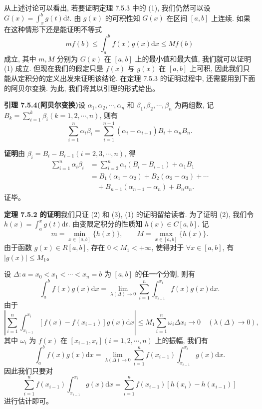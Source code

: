 \documentclass[UTF8, 12pt, fontset=fandol, oneside]{ctexart}
\begin{document}
从上述讨论可以看出, 若要证明定理 7.5.3 中的 (1), 我们仍然可以设 $G(x)=\int_x^b g(t)\mathrm dt$. 由 $g(x)$ 的可积性知 $G(x)$ 在区间 $[a,b]$ 上连续. 如果在这种情形下还是能证明不等式
\[
  mf(b)\leq\int_a^b f(x)g(x)\mathrm dx\leq Mf(b)
\]
成立, 其中 $m,M$ 分别为 $G(x)$ 在 $[a,b]$ 上的最小值和最大值, 我们就可以证明 (1) 成立. 但现在我们的假定只是 $f(x)$ 与 $g(x)$ 在 $[a,b]$ 上可积, 因此我们只能从定积分的定义出发来证明该结论. 在定理 7.5.3 的证明过程中, 还需要用到下面的阿贝尔变换. 为此, 我们将其以引理的形式给出。

\noindent\textbf{引理 7.5.4(阿贝尔变换)}\quad 设 $\alpha_1,\alpha_2,\cdots,\alpha_n$ 和 $\beta_1,\beta_2,\cdots,\beta_n$ 为两组数, 记 $B_k=\sum_{i=1}^k\beta_i(k=1,2,\cdots,n)$, 则有
\[
  \sum_{i=1}^n\alpha_i\beta_i
  =\sum_{i=1}^{n-1}(\alpha_i-\alpha_{i+1})B_i+\alpha_nB_n.
\]

\noindent\textbf{证明}\quad 由 $\beta_i=B_i-B_{i-1}(i=2,3,\cdots,n)$, 得
\[
\begin{aligned}
  \sum_{i=1}^n\alpha_i\beta_i
  &=\sum_{i=2}^n\alpha_i(B_i-B_{i-1})+\alpha_1B_1\\
  &=B_1(\alpha_1-\alpha_2)+B_2(\alpha_2-\alpha_3)+\cdots\\
  &\quad+B_{n-1}(\alpha_{n-1}-\alpha_n)+B_n\alpha_n.
\end{aligned}
\]
证毕。

\noindent\textbf{定理 7.5.2 的证明}\quad 我们只证 (2) 和 (3), (1) 的证明留给读者. 为了证明 (2), 我们令 $h(x)=\int_a^x g(t)\mathrm dt$. 由变限定积分的性质知 $h(x)\in C[a,b]$. 记
\[
  m=\min_{x\in[a,b]}\{h(x)\},\qquad
  M=\max_{x\in[a,b]}\{h(x)\}.
\]
由于函数 $g(x)\in R[a,b]$, 存在 $0<M_1<+\infty$, 使得对于 $\forall x\in[a,b]$, 有 $|g(x)|\leq M_1$。

设 $\Delta:a=x_0<x_1<\cdots<x_n=b$ 为 $[a,b]$ 的任一个分割, 则有
\[
  \int_a^b f(x)g(x)\mathrm dx
  =\lim_{\lambda(\Delta)\to0}\sum_{i=1}^n\int_{x_{i-1}}^{x_i} f(x)g(x)\mathrm dx.
\]
由于
\[
  \left|\sum_{i=1}^n\int_{x_{i-1}}^{x_i}[f(x)-f(x_{i-1})]g(x)\mathrm dx\right|
  \leq M_1\sum_{i=1}^n\omega_i\Delta x_i\to0\quad(\lambda(\Delta)\to0),
\]
其中 $\omega_i$ 为 $f(x)$ 在 $[x_{i-1},x_i](i=1,2,\cdots,n)$ 上的振幅, 我们有
\[
  \int_a^b f(x)g(x)\mathrm dx
  =\lim_{\lambda(\Delta)\to0}\sum_{i=1}^n f(x_{i-1})\int_{x_{i-1}}^{x_i}g(x)\mathrm dx.
\]
因此我们只要对
\[
  \sum_{i=1}^n f(x_{i-1})\int_{x_{i-1}}^{x_i}g(x)\mathrm dx
  =\sum_{i=1}^n f(x_{i-1})[h(x_i)-h(x_{i-1})]
\]
进行估计即可。
\end{document}
